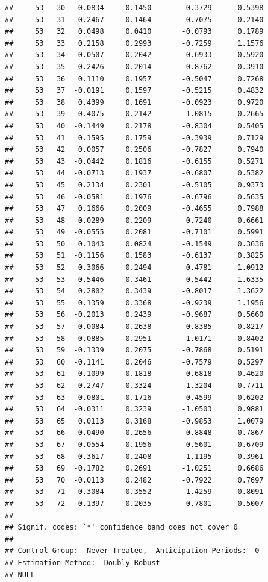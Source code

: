 \documentclass[
]{article}
\begin{document}
\begin{verbatim}
##     53   30   0.0834     0.1450       -0.3729      0.5398  
##     53   31  -0.2467     0.1464       -0.7075      0.2140  
##     53   32   0.0498     0.0410       -0.0793      0.1789  
##     53   33   0.2158     0.2993       -0.7259      1.1576  
##     53   34  -0.0507     0.2042       -0.6933      0.5920  
##     53   35  -0.2426     0.2014       -0.8762      0.3910  
##     53   36   0.1110     0.1957       -0.5047      0.7268  
##     53   37  -0.0191     0.1597       -0.5215      0.4832  
##     53   38   0.4399     0.1691       -0.0923      0.9720  
##     53   39  -0.4075     0.2142       -1.0815      0.2665  
##     53   40  -0.1449     0.2178       -0.8304      0.5405  
##     53   41   0.1595     0.1759       -0.3939      0.7129  
##     53   42   0.0057     0.2506       -0.7827      0.7940  
##     53   43  -0.0442     0.1816       -0.6155      0.5271  
##     53   44  -0.0713     0.1937       -0.6807      0.5382  
##     53   45   0.2134     0.2301       -0.5105      0.9373  
##     53   46  -0.0581     0.1976       -0.6796      0.5635  
##     53   47   0.1666     0.2009       -0.4655      0.7988  
##     53   48  -0.0289     0.2209       -0.7240      0.6661  
##     53   49  -0.0555     0.2081       -0.7101      0.5991  
##     53   50   0.1043     0.0824       -0.1549      0.3636  
##     53   51  -0.1156     0.1583       -0.6137      0.3825  
##     53   52   0.3066     0.2494       -0.4781      1.0912  
##     53   53   0.5446     0.3461       -0.5442      1.6335  
##     53   54   0.2802     0.3439       -0.8017      1.3622  
##     53   55   0.1359     0.3368       -0.9239      1.1956  
##     53   56  -0.2013     0.2439       -0.9687      0.5660  
##     53   57  -0.0084     0.2638       -0.8385      0.8217  
##     53   58  -0.0885     0.2951       -1.0171      0.8402  
##     53   59  -0.1339     0.2075       -0.7868      0.5191  
##     53   60  -0.1141     0.2046       -0.7579      0.5297  
##     53   61  -0.1099     0.1818       -0.6818      0.4620  
##     53   62  -0.2747     0.3324       -1.3204      0.7711  
##     53   63   0.0801     0.1716       -0.4599      0.6202  
##     53   64  -0.0311     0.3239       -1.0503      0.9881  
##     53   65   0.0113     0.3168       -0.9853      1.0079  
##     53   66  -0.0490     0.2656       -0.8848      0.7867  
##     53   67   0.0554     0.1956       -0.5601      0.6709  
##     53   68  -0.3617     0.2408       -1.1195      0.3961  
##     53   69  -0.1782     0.2691       -1.0251      0.6686  
##     53   70  -0.0113     0.2482       -0.7922      0.7697  
##     53   71  -0.3084     0.3552       -1.4259      0.8091  
##     53   72  -0.1397     0.2035       -0.7801      0.5007  
## ---
## Signif. codes: `*' confidence band does not cover 0
## 
## Control Group:  Never Treated,  Anticipation Periods:  0
## Estimation Method:  Doubly Robust
## NULL
\end{verbatim}
\end{document}

